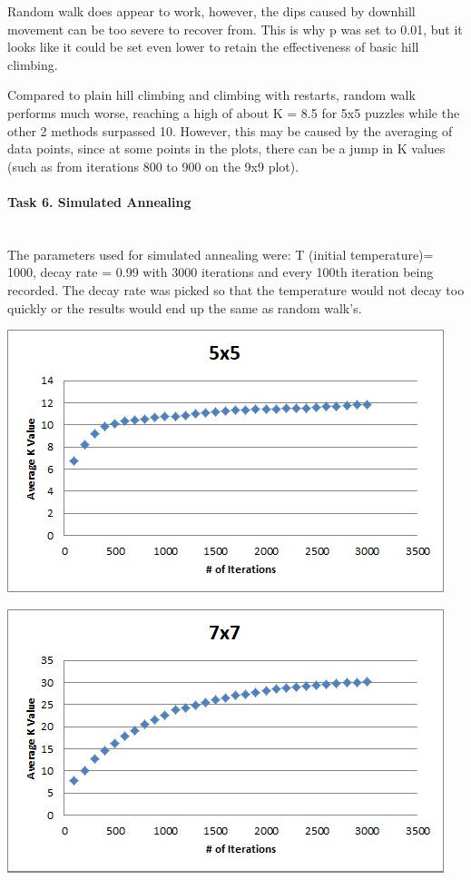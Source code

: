 \documentclass[12pt, letterpaper]{article}
\begin{document}
\bigskip

Random walk does appear to work, however, the dips caused by downhill movement can be too severe to recover from. This is why p was set to 0.01, but it looks like it could be set even lower to retain the effectiveness of basic hill climbing. 

Compared to plain hill climbing and climbing with restarts, random walk performs much worse, reaching a high of about K = 8.5 for 5x5 puzzles while the other 2 methods surpassed 10. However, this may be caused by the averaging of data points, since at some points in the plots, there can be a jump in K values (such as from iterations 800 to 900 on the 9x9 plot).

\pagebreak
\paragraph{Task 6. Simulated Annealing} \mbox{}\\

The parameters used for simulated annealing were: T (initial temperature)= 1000, decay rate = 0.99 with 3000 iterations and every 100th iteration being recorded. The decay rate was picked so that the temperature would not decay too quickly or the results would end up the same as random walk's.

\includegraphics[width=\linewidth]{"Task 6/5x5 Scatterplot"}

\bigskip

\includegraphics[width=\linewidth]{"Task 6/7x7 Scatterplot"}
\end{document}
